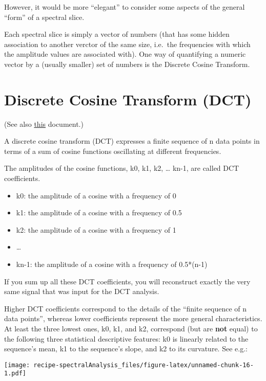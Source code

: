 \documentclass[
]{book}
\providecommand{\tightlist}{%
  \setlength{\itemsep}{0pt}\setlength{\parskip}{0pt}}
\begin{document}
However, it would be more ``elegant'' to consider some aspects of the general ``form'' of a spectral slice.

Each spectral slice is simply a vector of numbers (that has some hidden association to another verctor of the same size, i.e.~the frequencies with which the amplitude values are associated with). One way of quantifying a numeric vector by a (usually smaller) set of numbers is the Discrete Cosine Transform.

\hypertarget{discrete-cosine-transform-dct}{%
\section{Discrete Cosine Transform (DCT)}\label{discrete-cosine-transform-dct}}

(See also \href{https://www.phonetik.uni-muenchen.de/~jmh/lehre/sem/ws0910/R/dct.pdf}{this} document.)

A discrete cosine transform (DCT) expresses a finite sequence of n data points in terms of a sum of cosine functions oscillating at different frequencies.

The amplitudes of the cosine functions, k0, k1, k2, \ldots{} kn-1, are called DCT coefficients.

\begin{itemize}
\tightlist
\item
  k0: the amplitude of a cosine with a frequency of 0
\item
  k1: the amplitude of a cosine with a frequency of 0.5
\item
  k2: the amplitude of a cosine with a frequency of 1
\item
  \ldots{}
\item
  kn-1: the amplitude of a cosine with a frequency of 0.5*(n-1)
\end{itemize}

If you sum up all these DCT coefficients, you will reconstruct exactly the very same signal that was input for the DCT analysis.

Higher DCT coefficients correspond to the details of the ``finite sequence of n data points'', whereas lower coefficients represent the more general characteristics. At least the three lowest ones, k0, k1, and k2, correspond (but are \textbf{not} equal) to the following three statistical descriptive features: k0 is linearly related to the sequence's mean, k1 to the sequence's slope, and k2 to its curvature. See e.g.:

\texttt{[image: recipe-spectralAnalysis\_files/figure-latex/unnamed-chunk-16-1.pdf]}
\end{document}
